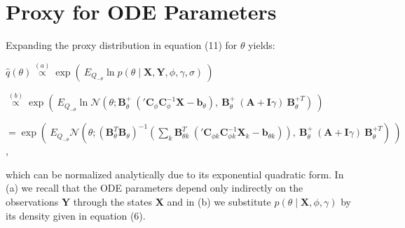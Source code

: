 \section{Proxy for ODE Parameters}
\begin{par}
Expanding the proxy distribution in equation (11) for $\theta$ yields:
\end{par} \vspace{1em}
\begin{par}
$\hat{q}(\theta) \stackrel{(a)}{\propto} \exp \left( ~E_{Q_{-\theta}} \ln p(\theta \mid \mathbf{X},\mathbf{Y},\phi,\gamma,\sigma) ~ \right)$
\end{par} \vspace{1em}
\begin{par}
$\stackrel{(b)}{\propto} \exp \left( ~E_{Q_{-\theta}}  \ln \mathcal{N} \left( \theta; \mathbf{B}_{\theta}^+ ~ \left( '\mathbf{C}_{\phi} \mathbf{C}_{\phi}^{-1} \mathbf{X} - \mathbf{b}_{\theta} \right), ~ \mathbf{B}_{\theta}^+ ~ (\mathbf{A} + \mathbf{I}\gamma) ~ \mathbf{B}_{\theta}^{+T} \right) ~\right)$
\end{par} \vspace{1em}
\begin{par}
$= \exp \left( ~E_{Q_{-\theta}} \mathcal{N}\left(\theta ; \left( \mathbf{B}_{\theta}^T \mathbf{B}_{\theta} \right)^{-1} \left( \sum_k \mathbf{B}_{\theta k}^T ~ \left( {'\mathbf{C}_{\phi k}} \mathbf{C}_{\phi k}^{-1} \mathbf{X}_k - \mathbf{b}_{\theta k} \right) \right), ~ \mathbf{B}_{\theta}^+ ~ (\mathbf{A} + \mathbf{I}\gamma) ~ \mathbf{B}_{\theta}^{+T} \right) ~\right)$,
\end{par} \vspace{1em}
\begin{par}
which can be normalized analytically due to its exponential quadratic form. In (a) we recall that the ODE parameters depend only indirectly on the observations $\mathbf{Y}$ through the states $\mathbf{X}$ and in (b) we substitute $p(\theta \mid \mathbf{X},\phi,\gamma)$ by its density given in equation (6).
\end{par} \vspace{1em}

